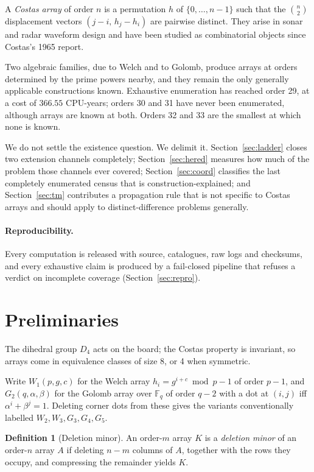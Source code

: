 \documentclass[11pt,a4paper]{article}
\theoremstyle{definition}
\newtheorem{definition}[theorem]{Definition}
\theoremstyle{remark}
\newcommand{\F}{\mathbb{F}}
\begin{document}
A \emph{Costas array} of order $n$ is a permutation $h$ of $\{0,\dots,n-1\}$ such
that the $\binom{n}{2}$ displacement vectors $(j-i,\,h_j-h_i)$ are pairwise
distinct. They arise in sonar and radar waveform design and have been studied as
combinatorial objects since Costas's 1965 report.

Two algebraic families, due to Welch and to Golomb, produce arrays at orders
determined by the prime powers nearby, and they remain the only generally
applicable constructions known. Exhaustive enumeration has reached order 29, at
a cost of $366.55$ CPU-years; orders 30 and 31 have never been enumerated,
although arrays are known at both. Orders 32 and 33 are the smallest at which
none is known.

We do not settle the existence question. We delimit it. Section~\ref{sec:ladder}
closes two extension channels completely; Section~\ref{sec:hered} measures how
much of the problem those channels ever covered; Section~\ref{sec:coord}
classifies the last completely enumerated census that is construction-explained;
and Section~\ref{sec:tm} contributes a propagation rule that is not specific to
Costas arrays and should apply to distinct-difference problems generally.

\paragraph{Reproducibility.} Every computation is released with source,
catalogues, raw logs and checksums, and every exhaustive claim is produced by a
fail-closed pipeline that refuses a verdict on incomplete coverage
(Section~\ref{sec:repro}).

\section{Preliminaries}

The dihedral group $D_4$ acts on the board; the Costas property is invariant, so
arrays come in equivalence classes of size 8, or 4 when symmetric.

Write $W_1(p,g,c)$ for the Welch array $h_i = g^{i+c} \bmod p - 1$ of order
$p-1$, and $G_2(q,\alpha,\beta)$ for the Golomb array over $\F_q$ of order $q-2$
with a dot at $(i,j)$ iff $\alpha^i+\beta^j=1$. Deleting corner dots from these
gives the variants conventionally labelled $W_2,W_3,G_3,G_4,G_5$.

\begin{definition}[Deletion minor]
An order-$m$ array $K$ is a \emph{deletion minor} of an order-$n$ array $A$ if
deleting $n-m$ columns of $A$, together with the rows they occupy, and
compressing the remainder yields $K$.
\end{definition}
\end{document}
